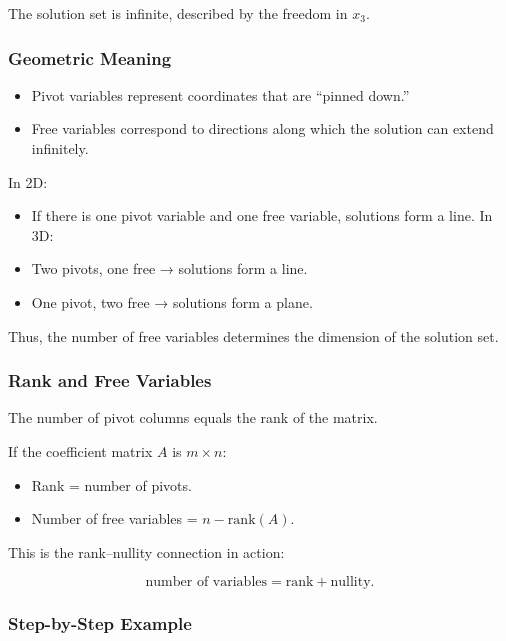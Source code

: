 \documentclass[
  letterpaper,
  DIV=11,
  numbers=noendperiod]{scrreprt}
\providecommand{\tightlist}{%
  \setlength{\itemsep}{0pt}\setlength{\parskip}{0pt}}
\begin{document}
The solution set is infinite, described by the freedom in \(x_3\).

\subsubsection{Geometric Meaning}\label{geometric-meaning-1}

\begin{itemize}
\tightlist
\item
  Pivot variables represent coordinates that are ``pinned down.''
\item
  Free variables correspond to directions along which the solution can
  extend infinitely.
\end{itemize}

In 2D:

\begin{itemize}
\tightlist
\item
  If there is one pivot variable and one free variable, solutions form a
  line. In 3D:
\item
  Two pivots, one free → solutions form a line.
\item
  One pivot, two free → solutions form a plane.
\end{itemize}

Thus, the number of free variables determines the dimension of the
solution set.

\subsubsection{Rank and Free Variables}\label{rank-and-free-variables}

The number of pivot columns equals the rank of the matrix.

If the coefficient matrix \(A\) is \(m \times n\):

\begin{itemize}
\tightlist
\item
  Rank = number of pivots.
\item
  Number of free variables = \(n - \text{rank}(A)\).
\end{itemize}

This is the rank--nullity connection in action:

\[
\text{number of variables} = \text{rank} + \text{nullity}.
\]

\subsubsection{Step-by-Step Example}\label{step-by-step-example-1}
\end{document}
